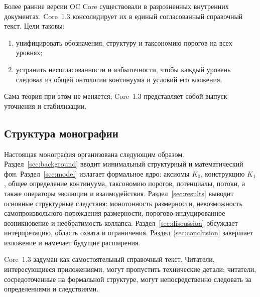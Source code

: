 Более ранние версии OC Core существовали в разрозненных внутренних документах. Core~1.3 консолидирует их в единый согласованный справочный текст. Цели таковы:

\begin{enumerate}
    \item унифицировать обозначения, структуру и таксономию порогов на всех уровнях;
    \item устранить несогласованности и избыточности, чтобы каждый уровень следовал из общей онтологии континуума и условий его вложения.
\end{enumerate}

Сама теория при этом не меняется; Core~1.3 представляет собой выпуск уточнения и стабилизации.

\subsection{Структура монографии}

Настоящая монография организована следующим образом.  
Раздел~\ref{sec:background} вводит минимальный структурный и математический фон.  
Раздел~\ref{sec:model} излагает формальное ядро: аксиомы \(K_0\), конструкцию \(K_1\), общее определение континуума, таксономию порогов, потенциалы, потоки, а также операторы эволюции и взаимодействия.  
Раздел~\ref{sec:results} выводит основные структурные следствия: монотонность размерности, невозможность самопроизвольного порождения размерности, порогово-индуцированное возникновение и необратимость коллапса.  
Раздел~\ref{sec:discussion} обсуждает интерпретацию, область охвата и ограничения.  
Раздел~\ref{sec:conclusion} завершает изложение и намечает будущие расширения.

Core~1.3 задуман как самостоятельный справочный текст. Читатели, интересующиеся приложениями, могут пропустить технические детали; читатели, сосредоточенные на формальной структуре, могут непосредственно следовать за определениями и следствиями.
